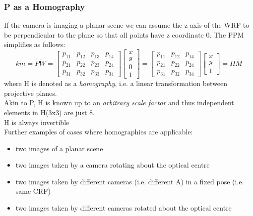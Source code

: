 \documentclass{article}
\begin{document}
\subsubsection{P as a Homography} \label{sec:homo}
If the camera is imaging a planar scene we can assume the z axis of the WRF to be perpendicular to the plane so that all points have z coordinate 0. The PPM simplifies as follows:
\begin{equation}
    k\tilde{m}=\tilde{P}\tilde{W}=\begin{bmatrix}
        p_{11} & p_{12} & p_{13} & p_{14} \\
        p_{21} & p_{22} & p_{23} & p_{24} \\
        p_{31} & p_{32} & p_{33} & p_{34} 
    \end{bmatrix} \begin{bmatrix}
        x\\
        y\\
        0\\
        1
    \end{bmatrix}=\begin{bmatrix}
        p_{11} & p_{12} & p_{14} \\
        p_{21} & p_{22} & p_{24} \\
        p_{31} & p_{32} & p_{34}
    \end{bmatrix} \begin{bmatrix}
        x\\
        y\\
        1
    \end{bmatrix}=H\tilde{M}
\end{equation}
where H is denoted as a \emph{homography}, i.e. a linear transformation between projective planes.\\
Akin to P, H is known up to an \emph{arbitrary scale factor} and thus independent elements in H(3x3) are just 8.\\
H is always invertible\\
Further examples of cases where homographies are applicable:
\begin{itemize}
    \item two images of a planar scene
    \item two images taken by a camera rotating about the optical centre
    \item two images taken by different cameras (i.e. different A) in a fixed pose (i.e. same CRF)
    \item two images taken by different cameras rotated about the optical centre
\end{itemize}
\end{document}
